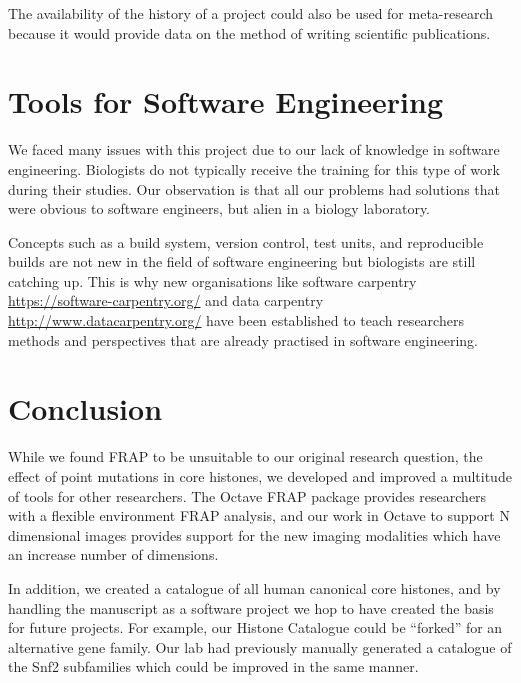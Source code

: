 The availability of the history of a project
could also be used for meta-research because it would provide data on the
method of writing scientific publications.

\section{Tools for Software Engineering}

We faced many issues with this project due to our lack of knowledge in
software engineering.  Biologists do not typically receive the training for this
type of work during their studies.  Our observation is that all our
problems had solutions that were obvious to software engineers, but
alien in a biology laboratory.

Concepts such as a build system, version control, test units,
and reproducible builds are not new in the field of software engineering but
biologists are still catching up.  This is why new
organisations like software
carpentry \url{https://software-carpentry.org/} and data
carpentry \url{http://www.datacarpentry.org/} have been established to
teach researchers
methods and perspectives that are already practised in software engineering.

\section{Conclusion}

While we found FRAP to be unsuitable to our original research
question, the effect of point mutations in core histones, we developed
and improved a multitude of tools for other researchers.  The Octave
FRAP package provides researchers with a flexible environment FRAP
analysis, and our work in Octave to support N dimensional images
provides support for the new imaging modalities which have an increase
number of dimensions.

In addition, we created a catalogue of all human canonical core
histones, and by handling the manuscript as a software project we hop
to have created the basis for future projects.  For example, our
Histone Catalogue could be ``forked'' for an alternative gene family.
Our lab had previously manually generated a catalogue of the Snf2
subfamilies \citep{andrew-snf2-catalogue} which could be improved in
the same manner.
